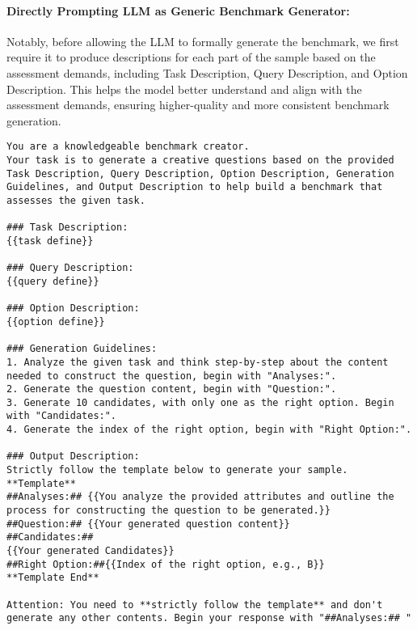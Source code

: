 \paragraph{Directly Prompting LLM as Generic Benchmark Generator:}
\label{sec:prompt_direct}
Notably, before allowing the LLM to formally generate the benchmark, we first require it to produce descriptions for each part of the sample based on the assessment demands, including Task Description, Query Description, and Option Description. This helps the model better understand and align with the assessment demands, ensuring higher-quality and more consistent benchmark generation.
\begin{lstlisting}
You are a knowledgeable benchmark creator.
Your task is to generate a creative questions based on the provided Task Description, Query Description, Option Description, Generation Guidelines, and Output Description to help build a benchmark that assesses the given task.

### Task Description:
{{task define}}

### Query Description:
{{query define}}

### Option Description:
{{option define}}

### Generation Guidelines:
1. Analyze the given task and think step-by-step about the content needed to construct the question, begin with "Analyses:".
2. Generate the question content, begin with "Question:".
3. Generate 10 candidates, with only one as the right option. Begin with "Candidates:".
4. Generate the index of the right option, begin with "Right Option:".

### Output Description:
Strictly follow the template below to generate your sample.
**Template**
##Analyses:## {{You analyze the provided attributes and outline the process for constructing the question to be generated.}}
##Question:## {{Your generated question content}}
##Candidates:##
{{Your generated Candidates}}
##Right Option:##{{Index of the right option, e.g., B}}
**Template End**

Attention: You need to **strictly follow the template** and don't generate any other contents. Begin your response with "##Analyses:## "
\end{lstlisting}


